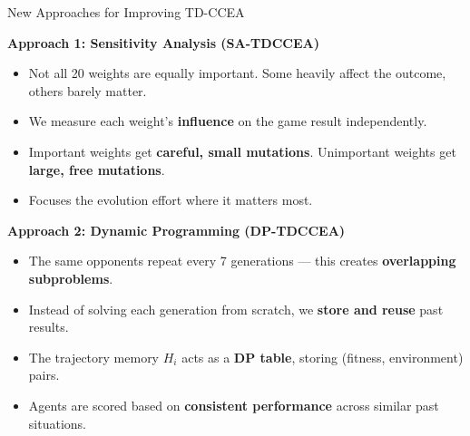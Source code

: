 \documentclass[aspectratio=169, 10pt]{beamer}
\begin{document}
\begin{frame}{New Approaches for Improving TD-CCEA}

\textbf{\textcolor{amritaMaroon}{Approach 1: Sensitivity Analysis (SA-TDCCEA)}}
\begin{itemize}
    \item Not all 20 weights are equally important. Some heavily affect the outcome, others barely matter.
    \item We measure each weight's \textbf{influence} on the game result independently.
    \item Important weights get \textbf{careful, small mutations}. Unimportant weights get \textbf{large, free mutations}.
    \item Focuses the evolution effort where it matters most.
\end{itemize}

\vspace{0.4cm}
\textbf{\textcolor{amritaMaroon}{Approach 2: Dynamic Programming (DP-TDCCEA)}}
\begin{itemize}
    \item The same opponents repeat every 7 generations --- this creates \textbf{overlapping subproblems}.
    \item Instead of solving each generation from scratch, we \textbf{store and reuse} past results.
    \item The trajectory memory $H_i$ acts as a \textbf{DP table}, storing (fitness, environment) pairs.
    \item Agents are scored based on \textbf{consistent performance} across similar past situations.
\end{itemize}

\end{frame}
\end{document}
